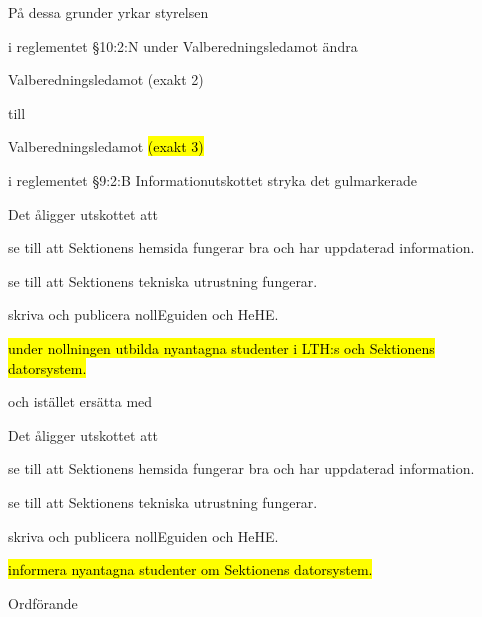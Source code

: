 \documentclass[../_main/handlingar.tex]{subfiles}
\begin{document}
På dessa grunder yrkar styrelsen
\begin{attsatser}
    
    \att i reglementet \S10:2:N  under Valberedningsledamot ändra
        \begin{emptylist}
            \item Valberedningsledamot (exakt 2)
         \end{emptylist}
    
        till 
    
        \begin{emptylist}
            \item Valberedningsledamot \hl{(exakt 3)}
        \end{emptylist}
        \changenote

    \att i reglementet \S9:2:B Informationutskottet stryka det gulmarkerade 
        \begin{emptylist}
            \item Det åligger utskottet att
            \begin{dashlist}
                \item se till att Sektionens hemsida fungerar bra och har uppdaterad information.
                \item se till att Sektionens tekniska utrustning fungerar.
                \item skriva och publicera nollEguiden och HeHE.
                \item \hl{under nollningen utbilda nyantagna studenter i LTH:s och Sektionens datorsystem.}
            \end{dashlist}
        \end{emptylist}
    
        och istället ersätta med
    
        \begin{emptylist}
            \item Det åligger utskottet att
            \begin{dashlist}
                \item se till att Sektionens hemsida fungerar bra och har uppdaterad information.
                \item se till att Sektionens tekniska utrustning fungerar.
                \item skriva och publicera nollEguiden och HeHE.
                \item \hl{informera nyantagna studenter om Sektionens datorsystem.}
            \end{dashlist}
        \end{emptylist}
        \changenote
        
    

\end{attsatser}







\begin{signatures}{1}
    \ist
    \signature{\ordf}{Ordförande}

\end{signatures}
\end{document}
